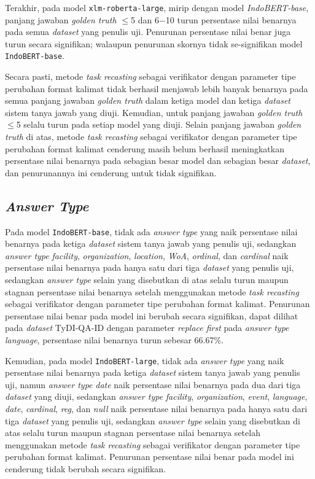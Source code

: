 Terakhir, pada model \texttt{xlm-roberta-large}, mirip dengan model \emph{IndoBERT-base}, panjang jawaban \emph{golden truth} $\leq$5 dan 6$-$10 turun persentase nilai benarnya pada semua \emph{dataset} yang penulis uji. Penurunan persentase nilai benar juga turun secara signifikan; walaupun penurunan skornya tidak se-signifikan model \texttt{IndoBERT-base}.

Secara pasti, metode \emph{task recasting} sebagai verifikator dengan parameter tipe perubahan format kalimat tidak berhasil menjawab lebih banyak benarnya pada semua panjang jawaban \emph{golden truth} dalam ketiga model dan ketiga \emph{dataset} sistem tanya jawab yang diuji. Kemudian, untuk panjang jawaban \emph{golden truth} $\leq$5 selalu turun pada setiap model yang diuji. Selain panjang jawaban \emph{golden truth} di atas, metode \emph{task recasting} sebagai verifikator dengan parameter tipe perubahan format kalimat cenderung masih belum berhasil meningkatkan persentase nilai benarnya pada sebagian besar model dan sebagian besar \emph{dataset}, dan penurunannya ini cenderung untuk tidak signifikan.

\subsection{\emph{Answer Type}}
Pada model \texttt{IndoBERT-base}, tidak ada \emph{answer type} yang naik persentase nilai benarnya pada ketiga \emph{dataset} sistem tanya jawab yang penulis uji, sedangkan \emph{answer type} \emph{facility}, \emph{organization}, \emph{location}, \emph{WoA}, \emph{ordinal}, dan \emph{cardinal} naik persentase nilai benarnya pada hanya satu dari tiga \emph{dataset} yang penulis uji, sedangkan \emph{answer type} selain yang disebutkan di atas selalu turun maupun stagnan persentase nilai benarnya setelah menggunakan metode \emph{task recasting} sebagai verifikator dengan parameter tipe perubahan format kalimat. Penurunan persentase nilai benar pada model ini berubah secara signifikan, dapat dilihat pada \emph{dataset} TyDI-QA-ID dengan parameter \emph{replace first} pada \emph{answer type} \emph{language}, persentase nilai benarnya turun sebesar 66.67\%.

Kemudian, pada model \texttt{IndoBERT-large}, tidak ada \emph{answer type} yang naik persentase nilai benarnya pada ketiga \emph{dataset} sistem tanya jawab yang penulis uji, namun \emph{answer type} \emph{date} naik persentase nilai benarnya pada dua dari tiga \emph{dataset} yang diuji, sedangkan \emph{answer type} \emph{facility}, \emph{organization}, \emph{event}, \emph{language}, \emph{date}, \emph{cardinal}, \emph{reg}, dan \emph{null} naik persentase nilai benarnya pada hanya satu dari tiga \emph{dataset} yang penulis uji, sedangkan \emph{answer type} selain yang disebutkan di atas selalu turun maupun stagnan persentase nilai benarnya setelah menggunakan metode \emph{task recasting} sebagai verifikator dengan parameter tipe perubahan format kalimat. Penurunan persentase nilai benar pada model ini cenderung tidak berubah secara signifikan.

